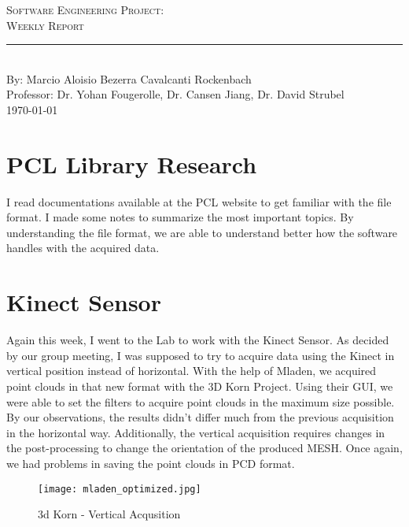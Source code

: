 \documentclass[aps,letterpaper,11pt]{revtex4}
\newcommand{\labno}{Software Engineering Project}
\newcommand{\labtitle}{Weekly Report}
\newcommand{\authorname}{Marcio Aloisio Bezerra Cavalcanti Rockenbach}
\newcommand{\professor}{Dr. Yohan Fougerolle, Dr. Cansen Jiang, Dr. David Strubel}
\begin{document}
  
\begin{titlepage}
\begin{center}
{\LARGE \textsc{\labno:} \\ \vspace{4pt}}
{\Large \textsc{\labtitle} \\ \vspace{4pt}} 
\rule[13pt]{\textwidth}{1pt} \\ \vspace{150pt}
{\large By: \authorname \\ \vspace{10pt}
Professor: \professor \\ \vspace{10pt}
\today}
\end{center}


\end{titlepage}%
\newpage
\setlength{\parindent}{5ex}

\section{PCL Library Research}
I read documentations available at the PCL website to get familiar with the file format. I made some notes to summarize the most important topics. By understanding the file format, we are able to understand better how the software handles with the acquired data.\\

\section {Kinect Sensor}
Again this week, I went to the Lab to work with the Kinect Sensor. As decided by our group meeting, I was supposed to try to acquire data using the Kinect in vertical position instead of horizontal. With the help of Mladen, we acquired point clouds in that new format with the 3D Korn Project. Using their GUI, we were able to set the filters to acquire point clouds in the maximum size possible. By our observations, the results didn't differ much from the previous acquisition in the horizontal way. Additionally, the vertical acquisition requires changes in the post-processing to change the orientation of the produced MESH. Once again, we had problems in saving the point clouds in PCD format.\\

\begin{figure}[!htb]
\centering
\texttt{[image: mladen\_optimized.jpg]}
\caption{3d Korn - Vertical Acqusition}
\end{figure}
\end{document}
